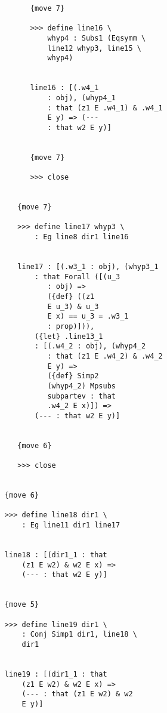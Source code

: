 \documentclass[12pt]{article}
\begin{document}
\begin{verbatim}
                        {move 7}

                        >>> define line16 \
                            whyp4 : Subs1 (Eqsymm \
                            line12 whyp3, line15 \
                            whyp4)


                        line16 : [(.w4_1 
                            : obj), (whyp4_1 
                            : that (z1 E .w4_1) & .w4_1 
                            E y) => (--- 
                            : that w2 E y)]


                        {move 7}

                        >>> close


                     {move 7}

                     >>> define line17 whyp3 \
                         : Eg line8 dir1 line16


                     line17 : [(.w3_1 : obj), (whyp3_1 
                         : that Forall ([(u_3 
                            : obj) => 
                            ({def} ((z1 
                            E u_3) & u_3 
                            E x) == u_3 = .w3_1 
                            : prop)])), 
                         ({let} .line13_1 
                         : [(.w4_2 : obj), (whyp4_2 
                            : that (z1 E .w4_2) & .w4_2 
                            E y) => 
                            ({def} Simp2 
                            (whyp4_2) Mpsubs 
                            subpartev : that 
                            .w4_2 E x)]) => 
                         (--- : that w2 E y)]


                     {move 6}

                     >>> close


                  {move 6}

                  >>> define line18 dir1 \
                      : Eg line11 dir1 line17


                  line18 : [(dir1_1 : that 
                      (z1 E w2) & w2 E x) => 
                      (--- : that w2 E y)]


                  {move 5}

                  >>> define line19 dir1 \
                      : Conj Simp1 dir1, line18 \
                      dir1


                  line19 : [(dir1_1 : that 
                      (z1 E w2) & w2 E x) => 
                      (--- : that (z1 E w2) & w2 
                      E y)]



\end{verbatim}
\end{document}
